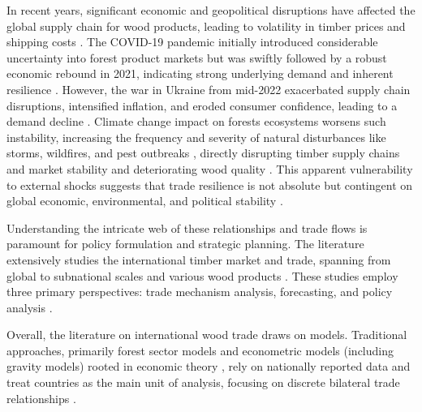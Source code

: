 \documentclass[
  authoryear,
  review,
  3p]{elsarticle}
\begin{document}
In recent years, significant economic and geopolitical disruptions have
affected the global supply chain for wood products, leading to
volatility in timber prices and shipping costs
\citep{fao_global_2024, unecefao_forest_2022}. The COVID-19 pandemic
initially introduced considerable uncertainty into forest product
markets but was swiftly followed by a robust economic rebound in 2021,
indicating strong underlying demand and inherent resilience
\citep{unecefao_forest_2022}. However, the war in Ukraine from mid-2022
exacerbated supply chain disruptions, intensified inflation, and eroded
consumer confidence, leading to a demand decline
\citep{unecefao_forest_2022}. Climate change impact on forests
ecosystems worsens such instability, increasing the frequency and
severity of natural disturbances like storms, wildfires, and pest
outbreaks
\citep{seidl_unraveling_2011, seidl_climate_2017, curtis_classifying_2018, tyukavina_global_2022, patacca_significant_2023},
directly disrupting timber supply chains and market stability and
deteriorating wood quality \citep{garcia-jacome_forest_2025}. This
apparent vulnerability to external shocks suggests that trade resilience
is not absolute but contingent on global economic, environmental, and
political stability
\citep{garcia-jacome_forest_2025, ma_modelling_2025}.

Understanding the intricate web of these relationships and trade flows
is paramount for policy formulation and strategic planning. The
literature extensively studies the international timber market and
trade, spanning from global to subnational scales and various wood
products
\citep[\emph{e.g.},][]{muller_longterm_2004, raunikar_global_2010, caurla_stimulating_2013, van_kooten_global_2014, buongiorno_global_2015, rougieux_modelling_2017, rougieux_impacts_2021, shen_structural_2022}.
These studies employ three primary perspectives: trade mechanism
analysis, forecasting, and policy analysis
\citep{buongiorno_gravity_2016, riviere_representations_2020, mathieu_meta-analysis_2023}.

Overall, the literature on international wood trade draws on models.
Traditional approaches, primarily forest sector models and econometric
models (including gravity models) rooted in economic theory
\citep{buongiorno_forest_1996, kallio_global_2004, latta_review_2013, northway_forest_2013, buongiorno_global_2015},
rely on nationally reported data and treat countries as the main unit of
analysis, focusing on discrete bilateral trade relationships
\citep{amador_networks_2017, shen_structural_2022}.
\end{document}
